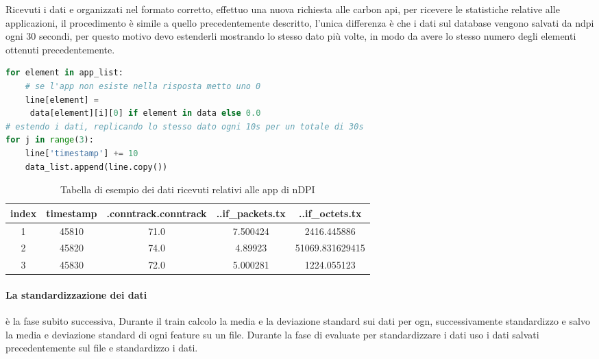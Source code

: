 Ricevuti i dati e organizzati nel formato corretto, effettuo una nuova richiesta alle carbon api, per ricevere le statistiche relative alle applicazioni, il procedimento è simile a quello precedentemente descritto, l'unica differenza è che i dati sul database vengono salvati da ndpi ogni 30 secondi, per questo motivo devo estenderli mostrando lo stesso dato più volte, in modo da avere lo stesso numero degli elementi ottenuti precedentemente.

\begin{lstlisting}[language=Python]
for element in app_list:
    # se l'app non esiste nella risposta metto uno 0
    line[element] =
     data[element][i][0] if element in data else 0.0
# estendo i dati, replicando lo stesso dato ogni 10s per un totale di 30s
for j in range(3):
    line['timestamp'] += 10
    data_list.append(line.copy())
\end{lstlisting}

\begin{table}[]

    \begin{tabular}{||c c c c c||} 
    \hline
    index & timestamp  & .conntrack.conntrack & ..if\_packets.tx & ..if\_octets.tx \\ [0.5ex] 
    \hline\hline
    1 & 45810 & 71.0 & 7.500424 & 2416.445886 \\ 
    \hline
    2 & 45820 & 74.0 & 4.89923 & 51069.831629415 \\
    \hline
    3 & 45830 & 72.0 & 5.000281 & 1224.055123 \\
    \hline
    \end{tabular}
    \caption{Tabella di esempio dei dati ricevuti relativi alle app di nDPI}
    \label{table:tabella_dati_2}
    \end{table}


\paragraph{La standardizzazione dei dati} è la fase subito successiva, 
Durante il train calcolo la media e la deviazione standard sui dati per ogn, successivamente standardizzo e salvo la media e deviazione standard di ogni feature su un file.
Durante la fase di evaluate per standardizzare i dati uso i dati salvati precedentemente sul file e standardizzo i dati.

